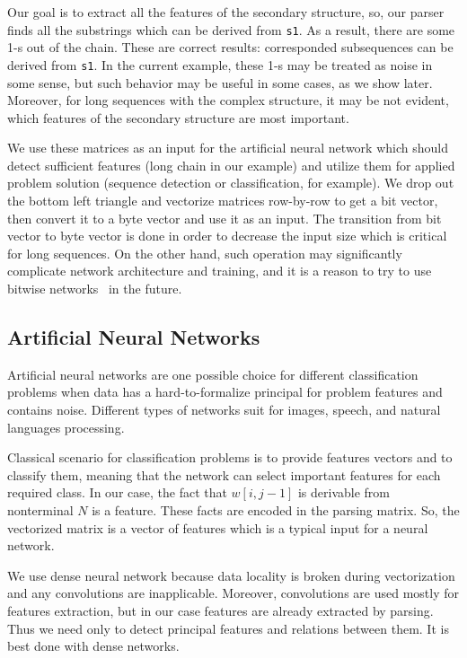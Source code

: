 \documentclass[a4paper,twoside]{article}
\begin{document}
Our goal is to extract all the features of the secondary structure, so, our parser finds all the substrings which can be derived from \verb|s1|.
As a result, there are some 1-s out of the chain.
These are correct results: corresponded subsequences can be derived from \verb|s1|. 
In the current example, these 1-s may be treated as noise in some sense, but such behavior may be useful in some cases, as we show later.
Moreover, for long sequences with the complex structure, it may be not evident, which features of the secondary structure are most important.

We use these matrices as an input for the artificial neural network which should detect sufficient features (long chain in our example) and utilize them for applied problem solution (sequence detection or classification, for example).
We drop out the bottom left triangle and vectorize matrices row-by-row to get a bit vector, then convert it to a byte vector and use it as an input.
The transition from bit vector to byte vector is done in order to decrease the input size which is critical for long sequences. 
On the other hand, such operation may significantly complicate network architecture and training, and it is a reason to try to use bitwise networks~\cite{DBLP:journals:corr:KimS16} in the future.  

\subsection{Artificial Neural Networks}

\noindent Artificial neural networks are one possible choice for different classification problems  when data has a hard-to-formalize principal for problem features and contains noise.
Different types of networks suit for images, speech, and natural languages processing.

Classical scenario for classification problems is to provide features vectors and to classify them, meaning that the network can select important features for each required class.
In our case, the fact that $w[i,j-1]$ is derivable from nonterminal $N$ is a feature.
These facts are encoded in the parsing matrix.
So, the vectorized matrix is a vector of features which is a typical input for a neural network.

We use dense neural network because data locality is broken during vectorization and any convolutions are inapplicable.
Moreover, convolutions are used mostly for features extraction, but in our case features are already extracted by parsing.
Thus we need only to detect principal features and relations between them.
It is best done with dense networks.
\end{document}
